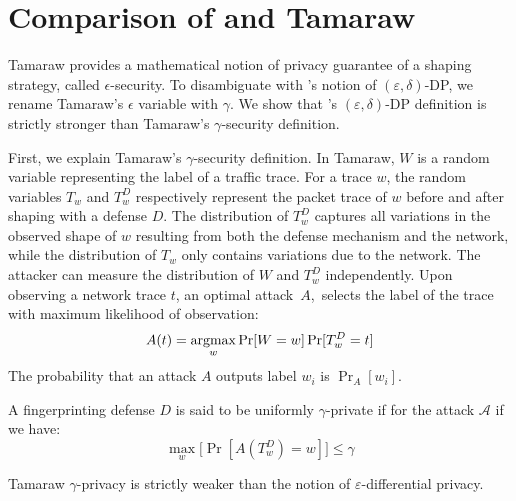 \section{Comparison of {\sys} and Tamaraw}
\label{appendix:tamaraw}
{\small
Tamaraw \cite{cai2014tamaraw} provides a
mathematical notion of privacy guarantee of a shaping strategy, called
$\epsilon$-security.
To disambiguate with {\sys}'s notion of
$(\varepsilon, \delta)$-DP, we rename Tamaraw's $\epsilon$
variable with $\gamma$.
We show that {\sys}'s $(\varepsilon, \delta)$-DP definition
is strictly stronger than Tamaraw's $\gamma$-security definition.

First, we explain Tamaraw's $\gamma$-security definition.
In Tamaraw, $W$ is a random variable representing the label of a
traffic trace.
For a trace $w$, the random variables $T_{w}$ and $T_{w}^{D}$ respectively
represent the packet trace of $w$ before and after shaping with a defense $D$.
The distribution of $T_{w}^D$ captures all variations in the observed
shape of $w$ resulting from both the defense mechanism and the
network, while the distribution of $T_{w}$ only contains variations due to
the network.
%
The attacker can measure the distribution of $W$ and $T_{w}^{D}$ independently.
%
Upon observing a network trace $t$, an optimal attack~$A$,~selects the
label of the trace with maximum likelihood of observation:
\begin{equation*}
  A(t) = \operatorname*{argmax}_{w}{\Pr[W=w]\Pr[T_{w}^{D}=t]}
\end{equation*}
The probability that an attack $A$ outputs label $w_i$ is $\Pr_A[w_i]$.
\begin{definition*}
  A fingerprinting defense $D$ is said to be uniformly $\gamma$-private if for the attack $\mathcal{A}$ if we have:
  \begin{equation*}
    \max_w\big[\Pr[A(T_w^D)=w]\big] \leq \gamma
  \end{equation*}
\end{definition*}
\begin{proposition}
  Tamaraw $\gamma$-privacy is strictly weaker than the notion of
  $\varepsilon$-differential privacy.
  \label{prop:tamaraw-vs-netshaper}
\end{proposition}

}
